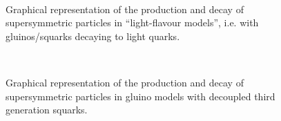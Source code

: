 \clearpage
\begin{figure}
    \begin{center}
        ~~
        ~~
        \caption{
            Graphical representation of the production and decay of
            supersymmetric particles in ``light-flavour models'', i.e. with
            gluinos/squarks decaying to light quarks.
        }
        \label{fig:simplified-models-feyn-light}
    \end{center}
\end{figure}

\begin{figure}[h!]
    \begin{center}
        ~~
        ~~
        \caption{
            Graphical representation of the production and decay of
            supersymmetric particles in gluino models with decoupled third
            generation squarks.
        }
        \label{fig:simplified-models-feyn-gluino}
    \end{center}
\end{figure}

